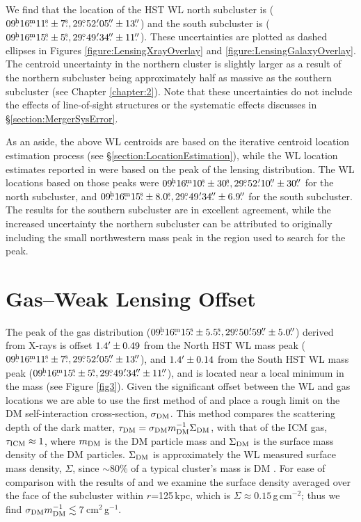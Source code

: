 We find that the location of the HST WL north subcluster is ($09\fh16\fm11\fs\pm7\fs, 29\fdg52\farcm05\farcs\pm13\farcs$) and the south subcluster is ($09\fh16\fm15\fs\pm5\fs, 29\fdg49\farcm34\farcs\pm11\farcs$).
These uncertainties are plotted as dashed ellipses in Figures \ref{figure:LensingXrayOverlay} and \ref{figure:LensingGalaxyOverlay}.
The centroid uncertainty in the northern cluster is slightly larger as a result of the northern subcluster being approximately half as massive as the southern subcluster (see Chapter \ref{chapter:2}).
Note that these uncertainties do not include the effects of line-of-sight structures or the systematic effects discusses in \S\ref{section:MergerSysError}.

As an aside, the above WL centroids are based on the iterative centroid location estimation process (see \S\ref{section:LocationEstimation}), while the WL location estimates reported in \citet{Dawson:2012dl} were based on the peak of the lensing distribution. 
The WL locations based on those peaks were  $09\fh16\fm10\fs\pm30\fs, 29\fdg52\farcm10\farcs\pm30\farcs$ for the north subcluster, and $09\fh16\fm15\fs\pm8.0\fs, 29\fdg49\farcm34\farcs\pm6.9\farcs$ for the south subcluster.
The results for the southern subcluster are in excellent agreement, while the increased uncertainty the northern subcluster can be attributed to originally including the small northwestern mass peak in the region used to search for the peak.

\section{Gas--Weak Lensing Offset}\label{section:GasWLOffset}

The peak of the gas distribution ($09\fh16\fm15\fs\pm5.5\fs, 29\fdg50\farcm59\farcs\pm5.0\farcs$) derived from X-rays is offset $1.4\mbox{$^\prime$}\pm0.49$ from the North HST WL mass peak ($09\fh16\fm11\fs\pm7\fs, 29\fdg52\farcm05\farcs\pm13\farcs$), and $1.4\mbox{$^\prime$}\pm0.14$ from the South HST WL mass peak ($09\fh16\fm15\fs\pm5\fs, 29\fdg49\farcm34\farcs\pm11\farcs$), and is located near a local minimum in the mass (see Figure \ref{fig3}).
Given the significant offset between the WL and gas locations we are able to use the first method of \citet{Markevitch:2004dl} and place a rough limit on the DM self-interaction cross-section, $\sigma_{\rm DM}$.
This method compares the scattering depth of the dark matter, $\tau_{\rm DM}=\sigma_{\rm DM}m^{-1}_{\rm DM} \Sigma_{\rm DM}$, with that of the ICM gas, $\tau_{\rm ICM}\approx 1$, where $m_{\rm DM}$ is the DM particle mass and $\Sigma_{\rm DM}$ is the surface mass density of the DM particles.
$\Sigma_{\rm DM}$ is approximately the WL measured surface mass density, $\Sigma$, since $\sim80\%$ of a typical cluster's mass is DM \citep{Diaferio:2008js}.
For ease of comparison with the results of \citet{Markevitch:2004dl} and \citet{Merten:2011gu} we examine the surface density averaged over the face of the subcluster within $r$=125\,kpc, which is $\Sigma\approx0.15$\,g\,cm$^{-2}$; thus we find $\sigma_{\rm DM} m_{\rm DM}^{-1} \lesssim 7$\,cm$^2$\,g$^{-1}$. 


